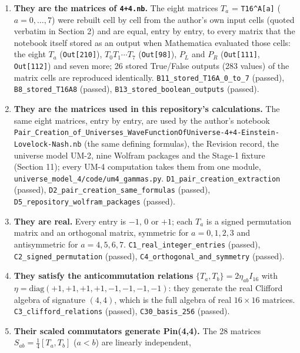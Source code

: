 \documentclass[
  10pt,
]{article}
\providecommand{\tightlist}{%
  \setlength{\itemsep}{0pt}\setlength{\parskip}{0pt}}
\begin{document}
\begin{enumerate}
\def\labelenumi{\arabic{enumi}.}
\tightlist
\item
  \textbf{They are the matrices of \texttt{4+4.nb}.} The eight matrices
  \(T_a\) = \texttt{T16\^{}A{[}a{]}} (\(a = 0, \dots, 7\)) were rebuilt
  cell by cell from the author's own input cells (quoted verbatim in
  Section 2) and are equal, entry by entry, to every matrix that the
  notebook itself stored as an output when Mathematica evaluated those
  cells: the eight \(T_a\) (\texttt{Out{[}210{]}}),
  \(T_0 T_1 \cdots T_7\) (\texttt{Out{[}98{]}}), \(P_L\) and \(P_R\)
  (\texttt{Out{[}111{]}}, \texttt{Out{[}112{]}}) and seven more; 26
  stored True/False outputs (283 values) of the matrix cells are
  reproduced identically. \texttt{B11\_stored\_T16A\_0\_to\_7} (passed),
  \texttt{B8\_stored\_T16A8} (passed),
  \texttt{B13\_stored\_boolean\_outputs} (passed).
\item
  \textbf{They are the matrices used in this repository's calculations.}
  The same eight matrices, entry by entry, are used by the author's
  notebook
  \texttt{Pair\_Creation\_of\_Universes\_WaveFunctionOfUniverse-4+4-Einstein-Lovelock-Nash.nb}
  (the same defining formulas), the Revision record, the universe model
  UM-2, nine Wolfram packages and the Stage-1 fixture (Section 11);
  every UM-4 computation takes them from one module,
  \texttt{universe\_model\_4/code/um4\_gammas.py}.
  \texttt{D1\_pair\_creation\_extraction} (passed),
  \texttt{D2\_pair\_creation\_same\_formulas} (passed),
  \texttt{D5\_repository\_wolfram\_packages} (passed).
\item
  \textbf{They are real.} Every entry is \(-1\), \(0\) or \(+1\); each
  \(T_a\) is a signed permutation matrix and an orthogonal matrix,
  symmetric for \(a = 0, 1, 2, 3\) and antisymmetric for
  \(a = 4, 5, 6, 7\). \texttt{C1\_real\_integer\_entries} (passed),
  \texttt{C2\_signed\_permutation} (passed),
  \texttt{C4\_orthogonal\_and\_symmetry} (passed).
\item
  \textbf{They satisfy the anticommutation relations}
  \(\{T_a, T_b\} = 2\eta_{ab}I_{16}\) with
  \(\eta = \mathrm{diag}(+1, +1, +1, +1, -1, -1, -1, -1)\): they
  generate the real Clifford algebra of signature \((4,4)\), which is
  the full algebra of real \(16 \times 16\) matrices.
  \texttt{C3\_clifford\_relations} (passed), \texttt{C30\_basis\_256}
  (passed).
\item
  \textbf{Their scaled commutators generate Pin(4,4).} The 28 matrices
  \(S_{ab} = \tfrac14[T_a, T_b]\) (\(a < b\)) are linearly independent,

\end{enumerate}
\end{document}
